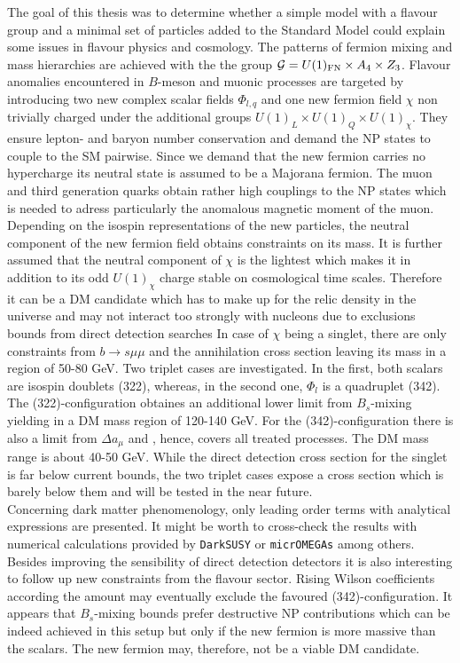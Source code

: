 The goal of this thesis was to determine whether a simple model with a flavour group and a minimal set of particles added to the Standard Model 
could explain some issues in flavour physics and cosmology. The patterns of fermion mixing and mass hierarchies are achieved with the the group
$\mathcal{G} = U(1)_\text{FN}\times A_4 \times Z_3$. Flavour anomalies encountered in $B$-meson and muonic processes are targeted by introducing two new complex 
scalar fields $\Phi_{l,q}$
and one new fermion field $\chi$ non trivially charged under the additional groups $U(1)_L\times U(1)_Q\times U(1)_\chi$. They ensure lepton- and baryon number
conservation and demand the NP states to couple to the SM pairwise. Since we demand that the new fermion carries no hypercharge its neutral state is 
assumed to be a Majorana fermion. The muon and third generation quarks obtain rather high couplings to the NP states which is needed to adress 
particularly the anomalous magnetic moment of the muon. Depending on the isospin representations of the new particles, the neutral component of the 
new fermion field obtains constraints on its mass. It is further assumed that the neutral component of $\chi$ is the lightest which makes it in
addition to its odd $U(1)_\chi$ charge stable on cosmological time scales. Therefore it can be a DM candidate which has to make up for the 
relic density in the universe and may not interact too strongly with nucleons due to exclusions bounds from direct detection searches
In case of $\chi$ being a singlet, there are only constraints from $b\rightarrow s\mu\mu$ and the annihilation cross section leaving its mass
in a region of 50-80 GeV. Two triplet cases are investigated. In the first, both scalars are isospin doublets (322), whereas, in the second one,
$\Phi_l$ is a quadruplet (342). The (322)-configuration obtaines an additional lower limit from $B_s$-mixing yielding in a DM mass region of
120-140 GeV. For the (342)-configuration there is also a limit from $\Delta a_\mu$ and , hence, covers all treated processes. The DM mass range
is about 40-50 GeV. While the direct detection cross section for the singlet is far below current bounds, the two triplet cases expose a cross section
which is barely below them and will be tested in the near future.\\
\noindent  Concerning dark matter phenomenology, only leading order
terms with analytical expressions are presented. It might be worth to cross-check the results with numerical calculations provided by 
\texttt{DarkSUSY} \cite{0406204} or \texttt{micrOMEGAs} \cite{1005.4133} among others. 
Besides improving the sensibility of direct detection detectors it is also interesting to follow up new constraints from the flavour 
sector. Rising Wilson coefficients according the amount may eventually exclude the favoured (342)-configuration. It appears that $B_s$-mixing bounds
prefer destructive NP contributions which can be indeed achieved in this setup but only if the new fermion is more massive than the scalars. The 
new fermion may, therefore, not be a viable DM candidate. 

